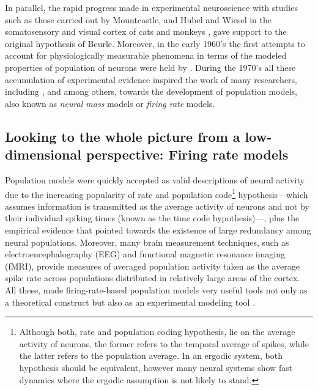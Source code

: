 In parallel, the
rapid progress made in experimental neuroscience 
with studies such as those carried out by Mountcastle, and Hubel and
Wiesel in the somatosensory and visual cortex of cats and monkeys
\citep{Mountcastle1957,Hubel1962,Hubel1968}, gave support to the
original hypothesis of Beurle. Moreover, in the early 1960's the first
attempts to account for physiologically measurable phenomena in terms of
the modeled properties of population of neurons were held by
\citet{Freeman1964}.  During the 1970's all
these accumulation of experimental evidence 
inspired the work of many researchers, including
\citet{Wilson1972,Wilson1973}, \citet{Kni72} and
\citet{Amari1972,Ama74,Amari1977} among others, towards the
development of population models, also known as \textit{neural mass}
models or \textit{firing rate} models.

\subsection*{Looking to the whole picture from a low-dimensional
  perspective: Firing rate models} 

Population models were quickly accepted as valid descriptions of neural
activity due to the increasing popularity of rate and population
code\footnote{Although both, rate and population coding hypothesis, lie on the average
  activity of neurons, the former refers to the temporal average of
  spikes, while the latter refers to the population average. In an
  ergodic system, both hypothesis should be equivalent, however many
  neural systems show fast dynamics where the ergodic assumption is
  not likely to stand.}
hypothesis---which assumes
information is transmitted as the average activity of neurons and not
by their individual spiking times (known as the time code hypothesis)---, plus the
empirical evidence that pointed towards the existence of large redundancy among
neural populations. Moreover,
many brain measurement techniques, such as electroencephalography (EEG) and
functional magnetic resonance imaging (fMRI), provide
measures of averaged population activity
taken as the average spike rate across populations distributed in
relatively large areas of the cortex. All these, made
firing-rate-based population models very useful tools not only as a
theoretical construct but also as an experimental modeling tool
\citep{Destexhe2009}. 

